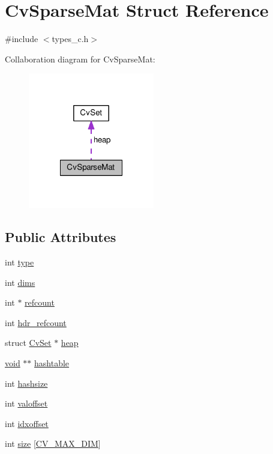 \hypertarget{structCvSparseMat}{\section{Cv\-Sparse\-Mat Struct Reference}
\label{structCvSparseMat}
}


{\ttfamily \#include $<$types\-\_\-c.\-h$>$}



Collaboration diagram for Cv\-Sparse\-Mat\-:\nopagebreak
\begin{figure}[H]
\begin{center}
\leavevmode
\includegraphics[width=156pt]{structCvSparseMat__coll__graph}
\end{center}
\end{figure}
\subsection*{Public Attributes}
\begin{DoxyCompactItemize}
\item 
int \hyperlink{structCvSparseMat_a14e4b63df7e0241a024b4a1e66abf5cf}{type}
\item 
int \hyperlink{structCvSparseMat_ae703789b8f2ef8d757250b888e8c2bf3}{dims}
\item 
int $\ast$ \hyperlink{structCvSparseMat_a84c838139e344c8897754e129dda10af}{refcount}
\item 
int \hyperlink{structCvSparseMat_abc100a040c983923065fcfac8379f1f1}{hdr\-\_\-refcount}
\item 
struct \hyperlink{structCvSet}{Cv\-Set} $\ast$ \hyperlink{structCvSparseMat_a32660f98736c3bb426df78c43eabdc1b}{heap}
\item 
\hyperlink{legacy_8hpp_a8bb47f092d473522721002c86c13b94e}{void} $\ast$$\ast$ \hyperlink{structCvSparseMat_ab8eb73e34a9d3c25d8523122efa770a2}{hashtable}
\item 
int \hyperlink{structCvSparseMat_ab506feb5f2501d55b8edd7f13309dfef}{hashsize}
\item 
int \hyperlink{structCvSparseMat_ae2894f3139e65d6d14faf1d815868a87}{valoffset}
\item 
int \hyperlink{structCvSparseMat_a446eb308a725b00b2adb928be97b97e9}{idxoffset}
\item 
int \hyperlink{structCvSparseMat_a724bb060c7da45c00e9d3a2e2e0212f1}{size} \mbox{[}\hyperlink{core_2types__c_8h_a931cb1f0da753cc1f8a3f838390616c2}{C\-V\-\_\-\-M\-A\-X\-\_\-\-D\-I\-M}\mbox{]}
\end{DoxyCompactItemize}


